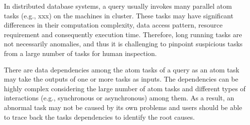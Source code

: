 %
%


 In distributed database systems, a query usually invokes many parallel atom tasks (e.g., xxx) on the machines in cluster. These tasks may have significant differences in their computation complexity, data access pattern, resource requirement and consequently execution time. Therefore, long running tasks are not necessarily anomalies, and thus it is challenging to pinpoint suspicious tasks from a large number of tasks for human inspection.        


 There are data dependencies among the atom tasks of a query as an atom task may take the outputs of one or more tasks as inputs. The dependencies  can be highly complex considering the large number of atom tasks and different types of interactions (e.g., synchronous or asynchronous) among them. As a result, an abnormal task may not be caused by its own problems and users should be able to trace back the tasks dependencies to identify the root causes.  



